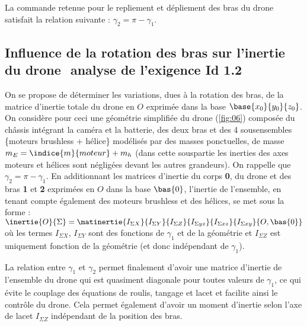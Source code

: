 La commande retenue pour le repliement et dépliement des bras du drone satisfait la relation
suivante : $\gamma_2 = \pi - \gamma_1$.


\ifprof
\begin{corrige}
\end{corrige}
\else
\fi



\subsection{Influence de la rotation des bras sur l’inertie du drone ­ analyse de l’exigence Id 1.2}
On se propose de déterminer les variations, dues à la rotation des bras, de la matrice d’inertie
totale du drone en $O$ exprimée dans la base $\base{x_0}{y_0}{z_0}$. On considère pour ceci une géométrie
simplifiée du drone (\autoref{fig:06}) composée du châssis intégrant la caméra et la batterie, des
deux bras et des 4 sous­ensembles \{moteurs brushless + hélice\} modélisés par des masses
ponctuelles, de masse $m_E = \indice{m}{moteur}+m_h$ (dans cette sous­partie les inerties des axes moteurs
et hélices sont négligées devant les autres grandeurs). On rappelle que $\gamma_2 = \pi - \gamma_1$.
En additionnant les matrices d’inertie du corps \textbf{0}, du drone et des bras \textbf{1} et \textbf{2} exprimées en $O$
dans la base $\bas{0}$, l’inertie de l’ensemble, en tenant compte également des moteurs brushless
et des hélices, se met sous la forme : $\inertie{O}{\Sigma} = \matinertie{I_{\Sigma X}}{I_{\Sigma Y}}{I_{\Sigma Z}}{I_{\Sigma yz}}{I_{\Sigma xz}}{I_{\Sigma xy}}{O,\bas{0}}$
où les termes $I_{\Sigma X}$, $I_{\Sigma Y}$ sont des fonctions de $\gamma_1$ et de la géométrie et $I_{\Sigma Z}$ est uniquement
fonction de la géométrie (et donc indépendant de $\gamma_1$).

\ifprof
\begin{corrige}

\end{corrige}
\else
\fi


La relation entre $\gamma_1$ et $\gamma_2$ permet finalement d’avoir une matrice d’inertie de l’ensemble du
drone qui est quasiment diagonale pour toutes valeurs de $\gamma_1$, ce qui évite le couplage des
équations de roulis, tangage et lacet et facilite ainsi le contrôle du drone. Cela permet également d’avoir un moment d’inertie selon l’axe de lacet  $I_{\Sigma Z}$ indépendant de la position des
bras.

